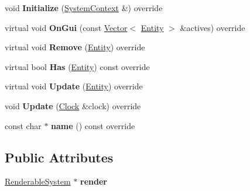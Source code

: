 \begin{DoxyCompactItemize}
\item 
\mbox{\label{classnabla_1_1_polygon_system_ae6cdaebb96b8f35fa6bdd9077d89b727}} 
void {\bfseries Initialize} (\mbox{\hyperlink{structnabla_1_1_system_context}{System\+Context}} \&) override
\item 
\mbox{\label{classnabla_1_1_polygon_system_ac3b7d9ce7bf3dfc00f38cf93d4b2bc41}} 
virtual void {\bfseries On\+Gui} (const \mbox{\hyperlink{classnabla_1_1_s_t_l_vector_ex}{Vector}}$<$ \mbox{\hyperlink{structnabla_1_1_entity}{Entity}} $>$ \&actives) override
\item 
\mbox{\label{classnabla_1_1_polygon_system_a87a9c2e0f0fa43cf0b91cf25f7e513fd}} 
virtual void {\bfseries Remove} (\mbox{\hyperlink{structnabla_1_1_entity}{Entity}}) override
\item 
\mbox{\label{classnabla_1_1_polygon_system_a0112d7d85a58c94f2f7f178153d3579f}} 
virtual bool {\bfseries Has} (\mbox{\hyperlink{structnabla_1_1_entity}{Entity}}) const override
\item 
\mbox{\label{classnabla_1_1_polygon_system_ad7f4f20b7b50fa2096d20697a3935601}} 
virtual void {\bfseries Update} (\mbox{\hyperlink{structnabla_1_1_entity}{Entity}}) override
\item 
\mbox{\label{classnabla_1_1_polygon_system_a6930777285a18998baf5edc124819261}} 
void {\bfseries Update} (\mbox{\hyperlink{classnabla_1_1_clock}{Clock}} \&clock) override
\item 
\mbox{\label{classnabla_1_1_polygon_system_a017e75cd02e943da81057c5aba6d6362}} 
const char $\ast$ {\bfseries name} () const override
\end{DoxyCompactItemize}
\subsection*{Public Attributes}
\begin{DoxyCompactItemize}
\item 
\mbox{\label{classnabla_1_1_polygon_system_a31e8ffa4b07e7761909d1afb7bd1f6f2}} 
\mbox{\hyperlink{classnabla_1_1_renderable_system}{Renderable\+System}} $\ast$ {\bfseries render}
\end{DoxyCompactItemize}


